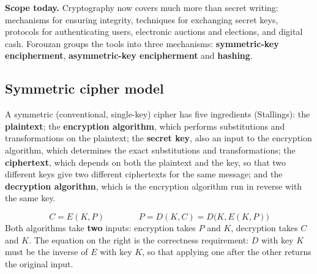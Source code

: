 \textbf{Scope today.} Cryptography now covers much more than secret writing: mechanisms for ensuring integrity, techniques for exchanging secret keys, protocols for authenticating users, electronic auctions and elections, and digital cash. Forouzan groups the tools into three mechanisms: \textbf{symmetric-key encipherment}, \textbf{asymmetric-key encipherment} and \textbf{hashing}.

\subsection{Symmetric cipher model}
A symmetric (conventional, single-key) cipher has five ingredients (Stallings): the \textbf{plaintext}; the \textbf{encryption algorithm}, which performs substitutions and transformations on the plaintext; the \textbf{secret key}, also an input to the encryption algorithm, which determines the exact substitutions and transformations; the \textbf{ciphertext}, which depends on both the plaintext and the key, so that two different keys give two different ciphertexts for the same message; and the \textbf{decryption algorithm}, which is the encryption algorithm run in reverse with the same key.

\begin{center}
\end{center}
\[
C = E(K, P) \qquad\qquad P = D(K, C) = D\big(K, E(K,P)\big)
\]
Both algorithms take \textbf{two} inputs: encryption takes $P$ and $K$, decryption takes $C$ and $K$. The equation on the right is the correctness requirement: $D$ with key $K$ must be the inverse of $E$ with key $K$, so that applying one after the other returns the original input.

